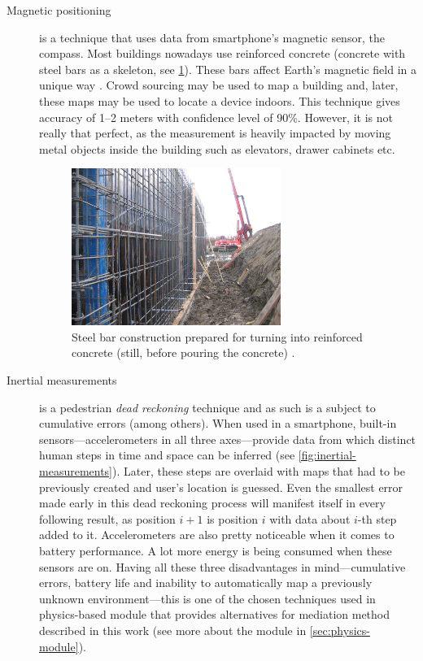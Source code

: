 \begin{description}
	\item[Magnetic positioning] is a technique that uses data from smartphone's magnetic sensor, the compass. Most buildings nowadays use reinforced concrete (concrete with steel bars as a skeleton, see \cref{fig:reinforced-concrete}). These bars affect Earth's magnetic field in a unique way \cite{Haverinen:magnetic}. Crowd sourcing may be used to map a building and, later, these maps may be used to locate a device indoors. This technique gives accuracy of 1--2 meters with confidence level of 90\%. However, it is not really that perfect, as the measurement is heavily impacted by moving metal objects inside the building such as elevators, drawer cabinets etc.
	
	\begin{figure}[h]
		\centering
		\includegraphics[width=0.67\textwidth]{reinforced-concrete}
		\caption{Steel bar construction prepared for turning into reinforced concrete (still, before pouring the concrete) \cite{penco:concrete}.}
		\label{fig:reinforced-concrete}
	\end{figure}
	
	\item[Inertial measurements] is a pedestrian \emph{dead reckoning} technique and as such is a subject to cumulative errors (among others). When used in a smartphone, built-in sensors---accelerometers in all three axes---provide data from which distinct human steps in time and space can be inferred (see \cref{fig:inertial-measurements}). Later, these steps are overlaid with maps that had to be previously created and user's location is guessed. Even the smallest error made early in this dead reckoning process will manifest itself in every following result, as position $i+1$ is position $i$ with data about $i$-th step added to it. Accelerometers are also pretty noticeable when it comes to battery performance. A lot more energy is being consumed when these sensors are on. Having all these three disadvantages in mind---cumulative errors, battery life and inability to automatically map a previously unknown environment---this is one of the chosen techniques used in physics-based module that provides alternatives for mediation method described in this work (see more about the module in \cref{sec:physics-module}).
	

\end{description}
